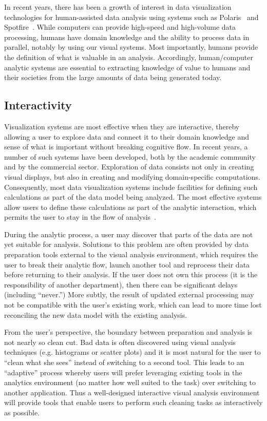 In recent years, there has been a growth of interest in data visualization technologies for human-assisted data analysis using systems such as Polaris~\cite{Stolte:2008} and Spotfire~\cite{Ahlberg:1996}. While computers can provide high-speed and high-volume data processing, humans have domain knowledge and the ability to process data in parallel, notably by using our visual systems. Most importantly, humans provide the definition of what is valuable in an analysis. Accordingly, human/computer analytic systems are essential to extracting knowledge of value to humans and their societies from the large amounts of data being generated today.


\subsection{Interactivity}
Visualization systems are most effective when they are interactive, thereby allowing a user to explore data and connect it to their domain knowledge and sense of what is important without breaking cognitive flow. In recent years, a number of such systems have been developed, both by the academic community and by the commercial sector. Exploration of data consists not only in creating visual displays, but also in creating and modifying domain-specific computations. Consequently, most data visualization systems include facilities for defining such calculations as part of the data model being analyzed. The most effective systems allow users to define these calculations as part of the analytic interaction, which permits the user to stay in the flow of analysis~\cite{Morton:2012}.

During the analytic process, a user may discover that parts of the data are not yet suitable for analysis. Solutions to this problem are often provided by data preparation tools external to the visual analysis environment, which requires the user to break their analytic flow, launch another tool and reprocess their data before returning to their analysis. If the user does not own this process (\eg it is the responsibility of another department), then there can be significant delays (including ``never.'') More subtly, the result of updated external processing may not be compatible with the user's existing work, which can lead to more time lost reconciling the new data model with the existing analysis.

From the user's perspective, the boundary between preparation and analysis is not nearly so clean cut. Bad data is often discovered using visual analysis techniques (e.g. histograms or scatter plots) and it is most natural for the user to ``clean what she sees'' instead of switching to a second tool. This leads to an ``adaptive'' process whereby users will prefer leveraging existing tools in the analytics environment (no matter how well suited to the task) over switching to another application. Thus a well-designed interactive visual analysis environment will provide tools that enable users to perform such cleaning tasks as interactively as possible.

